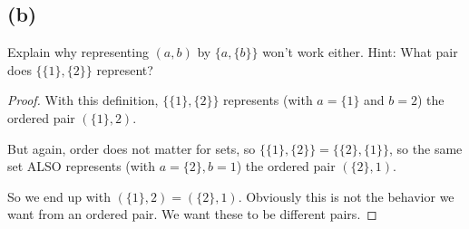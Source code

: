 \documentclass[14pt]{extarticle}
\begin{document}
\subsection{(b)}
Explain why representing $(a, b)$ by $\{a, \{b\}\}$ won’t work either. Hint: What pair does $\{\{1\}, \{2\}\}$ represent?
\begin{proof}
With this definition, $\{\{1\}, \{2\}\}$ represents (with $a = \{1\}$ and $b = 2$) the ordered pair $(\{1\}, 2)$.

But again, order does not matter for sets, so $\{\{1\}, \{2\}\} = \{\{2\}, \{1\}\}$, so the same set ALSO represents (with $a = \{2\}, b = 1$) the ordered pair $(\{2\}, 1)$.

So  we end up with $(\{1\}, 2) = (\{2\}, 1)$. Obviously this is not the behavior we want from an ordered pair. We want these to be different pairs.
\end{proof}
\end{document}
